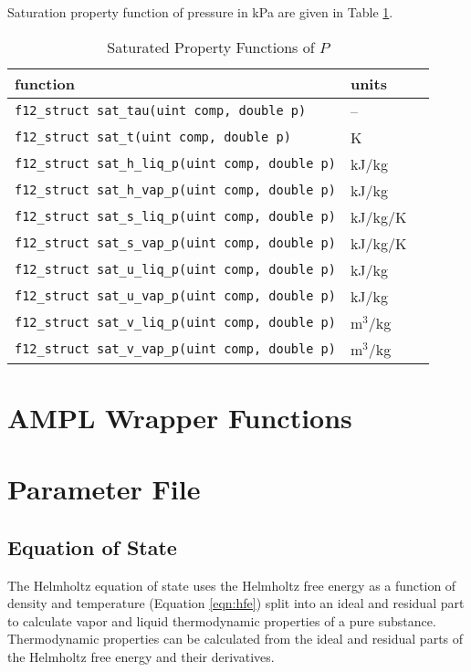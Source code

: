 \documentclass[oneside]{book}
\begin{document}
Saturation property function of pressure in kPa are given in Table \ref{table:sat_props_p}.

\begin{table}[h!]
\centering
\caption{Saturated Property Functions of $P$}
\begin{tabular}{ l l l }
\hline
function & units \\
\hline
\hline
\texttt{f12\_struct sat\_tau(uint comp, double p)} & -- \\ [1ex]
\texttt{f12\_struct sat\_t(uint comp, double p)} & K \\ [1ex]
\texttt{f12\_struct sat\_h\_liq\_p(uint comp, double p)} & kJ/kg \\ [1ex]
\texttt{f12\_struct sat\_h\_vap\_p(uint comp, double p)} & kJ/kg \\ [1ex]
\texttt{f12\_struct sat\_s\_liq\_p(uint comp, double p)} & kJ/kg/K \\ [1ex]
\texttt{f12\_struct sat\_s\_vap\_p(uint comp, double p)} & kJ/kg/K \\ [1ex]
\texttt{f12\_struct sat\_u\_liq\_p(uint comp, double p)} & kJ/kg \\ [1ex]
\texttt{f12\_struct sat\_u\_vap\_p(uint comp, double p)} & kJ/kg \\ [1ex]
\texttt{f12\_struct sat\_v\_liq\_p(uint comp, double p)} & m$^3$/kg \\ [1ex]
\texttt{f12\_struct sat\_v\_vap\_p(uint comp, double p)} & m$^3$/kg \\ [1ex]
 \hline    
\end{tabular}
\label{table:sat_props_p}
\end{table}

\chapter{AMPL Wrapper Functions}

\chapter{Parameter File}

\section{Equation of State}

The Helmholtz equation of state uses the Helmholtz free energy as a function of density and temperature (Equation \ref{eqn:hfe}) split into an ideal
and residual part to calculate vapor and liquid thermodynamic properties of a pure substance.  Thermodynamic properties can be calculated from the 
ideal and residual parts of the Helmholtz free energy and their derivatives.
\end{document}
